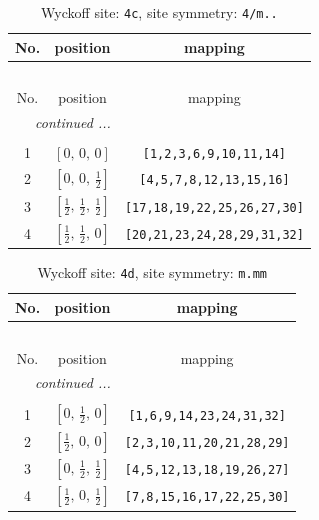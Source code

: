 \documentclass[fleqn,8pt]{jsarticle}
\begin{document}
\renewcommand{\arraystretch}{1.2}
\begin{longtable}{ccc}
\caption{Wyckoff site: {\tt 4c}, site symmetry: {\tt 4/m..}}
 \\
 \hline \hline
No. & position & mapping \\ \hline \endfirsthead

\multicolumn{2}{l}{\tablename\ \thetable{}} \\
 \hline \hline
No. & position & mapping \\ \hline \endhead

 \hline \hline
\multicolumn{2}{r}{\footnotesize\it continued ...} \\ \endfoot

 \hline \hline
\multicolumn{2}{r}{} \\ \endlastfoot

1 & $\left[ 0,\, 0,\, 0 \right]$ & {\tt [1,2,3,6,9,10,11,14]} \\ \hline
2 & $\left[ 0,\, 0,\, \frac{1}{2} \right]$ & {\tt [4,5,7,8,12,13,15,16]} \\ \hline
3 & $\left[ \frac{1}{2},\, \frac{1}{2},\, \frac{1}{2} \right]$ & {\tt [17,18,19,22,25,26,27,30]} \\ \hline
4 & $\left[ \frac{1}{2},\, \frac{1}{2},\, 0 \right]$ & {\tt [20,21,23,24,28,29,31,32]} \\
\end{longtable}
\renewcommand{\arraystretch}{1.2}
\begin{longtable}{ccc}
\caption{Wyckoff site: {\tt 4d}, site symmetry: {\tt m.mm}}
 \\
 \hline \hline
No. & position & mapping \\ \hline \endfirsthead

\multicolumn{2}{l}{\tablename\ \thetable{}} \\
 \hline \hline
No. & position & mapping \\ \hline \endhead

 \hline \hline
\multicolumn{2}{r}{\footnotesize\it continued ...} \\ \endfoot

 \hline \hline
\multicolumn{2}{r}{} \\ \endlastfoot

1 & $\left[ 0,\, \frac{1}{2},\, 0 \right]$ & {\tt [1,6,9,14,23,24,31,32]} \\ \hline
2 & $\left[ \frac{1}{2},\, 0,\, 0 \right]$ & {\tt [2,3,10,11,20,21,28,29]} \\ \hline
3 & $\left[ 0,\, \frac{1}{2},\, \frac{1}{2} \right]$ & {\tt [4,5,12,13,18,19,26,27]} \\ \hline
4 & $\left[ \frac{1}{2},\, 0,\, \frac{1}{2} \right]$ & {\tt [7,8,15,16,17,22,25,30]} \\
\end{longtable}
\end{document}

